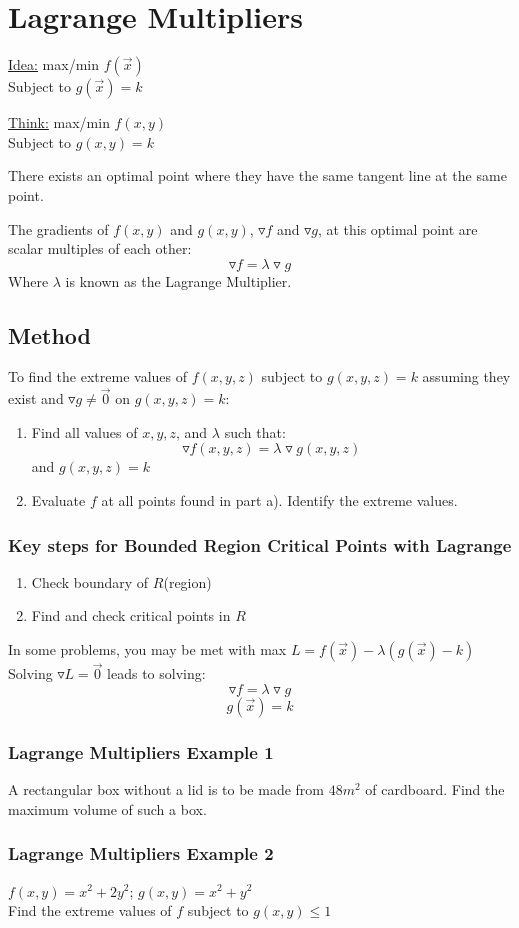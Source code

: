 \documentclass[12pt]{article}
\begin{document}
\section{Lagrange Multipliers}
\underline{Idea:} max/min \(f(\vec{x} ) \) \\
Subject to \(g(\vec{x} ) = k \) 

\underline{Think:} max/min \(f(x,y)\) \\
Subject to \(g(x,y) = k\) 

There exists an optimal point where they have the same tangent line at the same point.

The gradients of \(f(x,y)\) and \(g(x,y)\), \(\triangledown f\) and \(\triangledown g\),  at this optimal point are scalar multiples of each other:
\[
	\triangledown f = \lambda \triangledown g
\]
Where \(\lambda\) is known as the Lagrange Multiplier.

\subsection{Method}
To find the extreme values of \(f(x,y,z)\) subject to \(g(x,y,z) = k\) assuming they exist and \(\triangledown g \neq \vec{0}  \) on \(g(x,y,z) = k\):
\begin{enumerate}
	\item Find all values of \(x,y,z\), and \(\lambda\) such that:
		\[
			\triangledown f(x,y,z) = \lambda \triangledown g(x,y,z)
		\]
		and \(g(x,y,z) = k\) 
	\item Evaluate \(f\) at all points found in part a). Identify the extreme values.
\end{enumerate}

\subsubsection{Key steps for Bounded Region Critical Points with Lagrange}
\begin{enumerate}
	\item Check boundary of \(R\)(region) 
	\item Find and check critical points in \(R\) 
\end{enumerate}

In some problems, you may be met with max \(L = f(\vec{x} ) - \lambda(g(\vec{x} ) - k)  \) \\
Solving \(\triangledown L = \vec{0}  \) leads to solving:
\[
	\triangledown f = \lambda \triangledown g
\]
\[
	g(\vec{x} ) = k 
\]
\subsubsection{Lagrange Multipliers Example 1}
A rectangular box without a lid is to be made from \(48m^2\) of cardboard. Find the maximum volume of such a box.

\subsubsection{Lagrange Multipliers Example 2}
\(f(x,y) = x^2 + 2y^2\); \(g(x,y) = x^2 + y^2\) \\ 
Find the extreme values of \(f\) subject to \(g(x,y) \leq 1\) 
\end{document}
